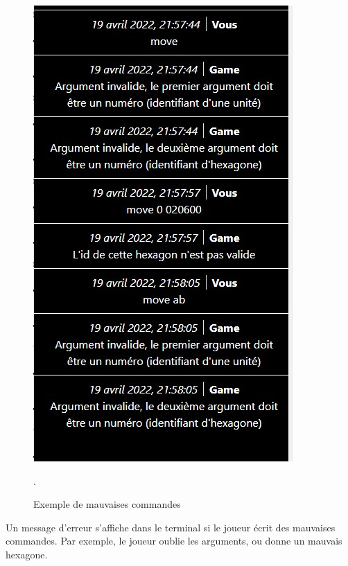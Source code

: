 \begin{figure}[H]
\centering
\includegraphics[scale=0.6]{data/erreur.jpg}
\caption{Exemple de mauvaises commandes}.
\end{figure}
Un message d'erreur s'affiche dans le terminal si le joueur écrit  des mauvaises commandes.
Par exemple, le joueur oublie les arguments, ou donne un mauvais hexagone.

